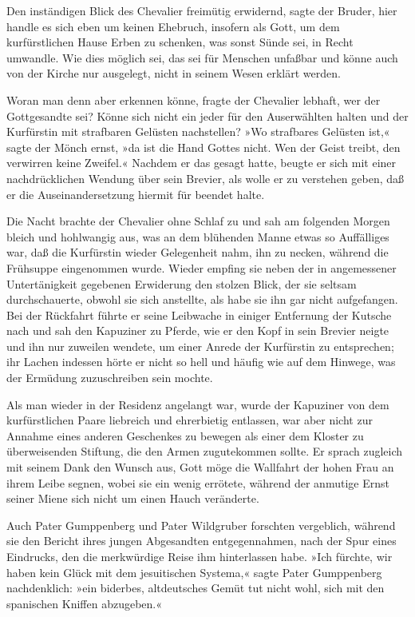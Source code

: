 Den inständigen Blick des Chevalier freimütig erwidernd, sagte der
Bruder, hier handle es sich eben um keinen Ehebruch, insofern als
Gott, um dem kurfürstlichen Hause Erben zu schenken, was sonst
Sünde sei, in Recht umwandle. Wie dies möglich sei, das sei für
Menschen unfaßbar und könne auch von der Kirche nur ausgelegt,
nicht in seinem Wesen erklärt werden.

Woran man denn aber erkennen könne, fragte der Chevalier lebhaft,
wer der Gottgesandte sei? Könne sich nicht ein jeder für den
Auserwählten halten und der Kurfürstin mit strafbaren Gelüsten
nachstellen? »Wo strafbares Gelüsten ist,« sagte der Mönch ernst,
»da ist die Hand Gottes nicht. Wen der Geist treibt, den verwirren
keine Zweifel.« Nachdem er das gesagt hatte, beugte er sich mit
einer nachdrücklichen Wendung über sein Brevier, als wolle er zu
verstehen geben, daß er die Auseinandersetzung hiermit für beendet
halte.

\pagenum{[114]}Die Nacht brachte der Chevalier ohne Schlaf zu und
sah am folgenden Morgen bleich und hohlwangig aus, was an dem
blühenden Manne etwas so Auffälliges war, daß die Kurfürstin wieder
Gelegenheit nahm, ihn zu necken, während die Frühsuppe eingenommen
wurde. Wieder empfing sie neben der in angemessener Untertänigkeit
gegebenen Erwiderung den stolzen Blick, der sie seltsam
durchschauerte, obwohl sie sich anstellte, als habe sie ihn gar
nicht aufgefangen. Bei der Rückfahrt führte er seine Leibwache in
einiger Entfernung der Kutsche nach und sah den Kapuziner zu
Pferde, wie er den Kopf in sein Brevier neigte und ihn nur zuweilen
wendete, um einer Anrede der Kurfürstin zu entsprechen; ihr Lachen
indessen hörte er nicht so hell und häufig wie auf dem Hinwege, was
der Ermüdung zuzuschreiben sein mochte.

Als man wieder in der Residenz angelangt war, wurde der Kapuziner
von dem kurfürstlichen Paare liebreich und ehrerbietig entlassen,
war aber nicht zur Annahme eines anderen Geschenkes zu bewegen als
einer dem Kloster zu überweisenden Stiftung, die den Armen
zugutekommen sollte. Er sprach zugleich mit seinem Dank den Wunsch
aus, Gott möge die Wallfahrt der hohen Frau an ihrem Leibe segnen,
wobei sie ein wenig errötete, während der anmutige Ernst seiner
Miene sich nicht um einen Hauch veränderte.

Auch Pater Gumppenberg und Pater Wildgruber forschten vergeblich,
während sie den Bericht ihres jungen Abgesandten entgegennahmen,
nach der Spur eines Eindrucks, den die merkwürdige Reise ihm
hinterlassen habe. »Ich fürchte, wir haben kein Glück mit dem
jesuitischen Systema,« sagte Pater Gumppenberg nachdenklich: »ein
biderbes, altdeutsches Gemüt tut nicht wohl, sich mit den
spanischen Kniffen abzugeben.«

